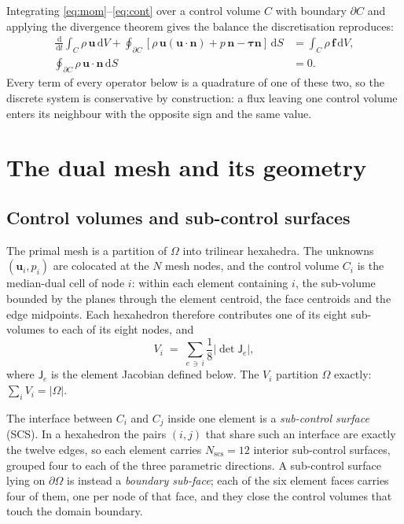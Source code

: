 \documentclass[11pt,a4paper]{article}
\newcommand{\bu}{\mathbf{u}}
\newcommand{\bn}{\mathbf{n}}
\newcommand{\bff}{\mathbf{f}}
\newcommand{\bJ}{\mathsf{J}}
\newcommand{\bttau}{\boldsymbol{\tau}}
\newcommand{\dd}{\,\mathrm{d}}
\begin{document}
Integrating \eqref{eq:mom}--\eqref{eq:cont} over a control volume $C$ with boundary
$\partial C$ and applying the divergence theorem gives the balance the discretisation
reproduces:
\begin{align}
  \frac{\dd}{\dd t} \int_C \rho\, \bu \dd V
  + \oint_{\partial C} \left[ \rho\, \bu (\bu \cdot \bn) + p\,\bn - \bttau \bn \right] \dd S
  &= \int_C \rho\, \bff \dd V , \label{eq:cvmom} \\[2pt]
  \oint_{\partial C} \rho\, \bu \cdot \bn \dd S &= 0 . \label{eq:cvcont}
\end{align}
Every term of every operator below is a quadrature of one of these two, so the discrete
system is conservative by construction: a flux leaving one control volume enters its
neighbour with the opposite sign and the same value.

\section{The dual mesh and its geometry}

\subsection{Control volumes and sub-control surfaces}

The primal mesh is a partition of $\Omega$ into trilinear hexahedra. The unknowns
$(\bu_i, p_i)$ are colocated at the $N$ mesh nodes, and the control volume $C_i$ is the
median-dual cell of node $i$: within each element containing $i$, the sub-volume bounded by
the planes through the element centroid, the face centroids and the edge midpoints. Each
hexahedron therefore contributes one of its eight sub-volumes to each of its eight nodes,
and
\begin{equation}
  V_i \;=\; \sum_{e \,\ni\, i} \frac{1}{8} \left| \det \bJ_e \right| ,
  \label{eq:nodevol}
\end{equation}
where $\bJ_e$ is the element Jacobian defined below. The $V_i$ partition $\Omega$ exactly:
$\sum_i V_i = |\Omega|$.

The interface between $C_i$ and $C_j$ inside one element is a \emph{sub-control surface}
(SCS). In a hexahedron the pairs $(i,j)$ that share such an interface are exactly the twelve
edges, so each element carries $N_{\mathrm{scs}} = 12$ interior sub-control surfaces, grouped
four to each of the three parametric directions. A sub-control surface lying on
$\partial\Omega$ is instead a \emph{boundary sub-face}; each of the six element faces carries
four of them, one per node of that face, and they close the control volumes that touch the
domain boundary.
\end{document}
